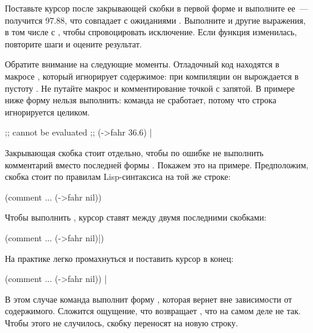 Поставьте курсор после закрывающей скобки в первой форме и выполните ее~--- получится 97.88, что совпадает с ожиданиями . Выполните и другие выражения, в том числе с , чтобы спровоцировать исключение. Если функция изменилась, повторите шаги и оцените результат.

Обратите внимание на следующие моменты. Отладочный код находятся в макросе , который игнорирует содержимое: при компиляции он вырождается в пустоту . Не путайте макрос  и комментирование точкой с запятой. В примере ниже форму нельзя выполнить: команда  не сработает, потому что строка игнорируется целиком.

\begin{english}
  \begin{clojure}
;; cannot be evaluated
;; (->fahr 36.6) |
  \end{clojure}
\end{english}

Закрывающая скобка  стоит отдельно, чтобы по ошибке не выполнить комментарий вместо последней формы . Покажем это на примере. Предположим, скобка стоит по правилам Lisp-синтаксиса на той же строке:

\begin{english}
  \begin{clojure}
(comment
  ...
  (->fahr nil))
  \end{clojure}
\end{english}

Чтобы выполнить , курсор ставят между двумя последними скобками:

\begin{english}
  \begin{clojure}
(comment
  ...
  (->fahr nil)|)
  \end{clojure}
\end{english}

На практике легко промахнуться и поставить курсор в конец:

\begin{english}
  \begin{clojure}
(comment
  ...
  (->fahr nil)) |
  \end{clojure}
\end{english}

В этом случае команда  выполнит форму , которая вернет  вне зависимости от содержимого. Сложится ощущение, что  возвращает , что на самом деле не так. Чтобы этого не случилось, скобку  переносят на новую строку.

